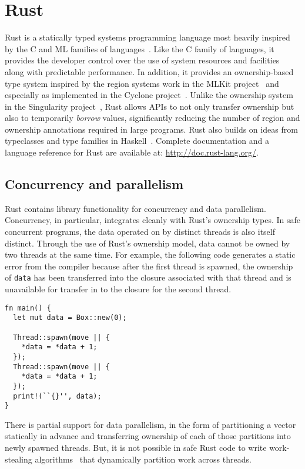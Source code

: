 
\section{Rust}
\label{sec:rust}

Rust is a statically typed systems programming language most heavily inspired by the C
and ML families of languages~\cite{RUST}.
Like the C family of languages, it provides the developer control over the use of system
resources and facilities along with predictable performance.
In addition, it provides an ownership-based type system inspired by the region systems work in the
MLKit project~\cite{mlkit} and especially as implemented in the Cyclone project~\cite{cyclone}.
Unlike the ownership system in the Singularity project~\cite{singularity}, Rust allows APIs to
not only transfer ownership but also to temporarily \emph{borrow} values, significantly
reducing the number of region and ownership annotations required in large programs.
Rust also builds on ideas from typeclasses and type families in Haskell~\cite{haskell}.
Complete documentation and a language reference for Rust are available at: \url{http://doc.rust-lang.org/}.

\subsection{Concurrency and parallelism}
Rust contains library functionality for concurrency and data parallelism.
Concurrency, in particular, integrates cleanly with Rust's ownership types.
In safe concurrent programs, the data operated on by distinct threads is also itself distinct.
Through the use of Rust's ownership model, data cannot be owned by two threads at the same time.
For example, the following code generates a static error from the compiler because after the first
thread is spawned, the ownership of \lstinline{data} has been transferred into the closure associated
with that thread and is unavailable for transfer in to the closure for the second thread.
\begin{lstlisting}
fn main() {
  let mut data = Box::new(0);

  Thread::spawn(move || {
    *data = *data + 1;
  });
  Thread::spawn(move || {
    *data = *data + 1;
  });
  print!(``{}'', data);
}
\end{lstlisting}

There is partial support for data parallelism, in the form of partitioning a vector statically in advance
and transferring ownership of each of those partitions into newly spawned threads.
But, it is not possible in safe Rust code to write work-stealing algorithms~\cite{blumeofe:multiprogrammed-work-stealing}
that dynamically partition work across threads.



